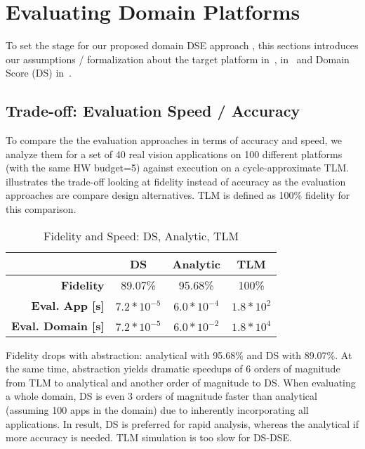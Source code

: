 \section{Evaluating Domain Platforms}
\label{sec:EvaOp}

To set the stage for our proposed domain DSE approach ,
this sections introduces our assumptions / formalization about the
target platform in~,  in~ and Domain Score (DS) in~. ~ 






\subsection{Trade-off: Evaluation Speed / Accuracy }
\label{sec:eva:sum}

To compare the the evaluation approaches in terms of accuracy and speed, we analyze them for a set of 40 real vision applications on 100 different platforms (with the same HW budget=5) against execution on a cycle-approximate TLM. %
 illustrates the trade-off looking at fidelity instead of accuracy as the evaluation approaches are compare design alternatives. TLM is defined as 100\% fidelity for this comparison.

\begin{table}[h]
	\caption{Fidelity and Speed: DS, Analytic, TLM}
	\label{tab:fidelity}
	\begin{tabular}{r||c|c|c}
		\toprule
		  & \textbf{DS}& \textbf{Analytic}& \textbf{TLM}\\
		\hline
		\midrule
		\textbf{Fidelity} & 89.07\%& 95.68\%& 100\%\\
		\hline
		\textbf{Eval. App [s]} & $7.2*10^{-5}$ & $6.0*10^{-4}$ & $1.8*10^2$ \\
		\hline
		\textbf{Eval. Domain [s]} & $7.2*10^{-5}$ & $6.0*10^{-2}$ & $1.8*10^4$ \\
		\bottomrule
	\end{tabular}
\end{table} 

Fidelity drops with abstraction: analytical with 95.68\% and DS with 89.07\%. At the same time, abstraction yields dramatic speedups of 6 orders of magnitude from TLM to analytical and another order of magnitude to DS. When evaluating a whole domain, DS is even 3 orders of magnitude faster than analytical (assuming 100 apps in the domain) due to inherently incorporating all applications. In result, DS is preferred for rapid analysis, whereas the analytical if more accuracy is needed. TLM simulation is too slow for DS-DSE.